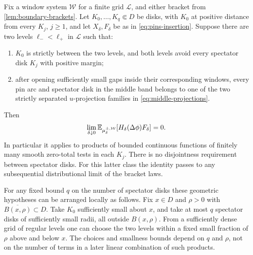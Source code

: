 \begin{proposition}\label{prop:bracket-identity}
Fix a window system $\mathcal W$ for a finite grid
$\mathcal L$, and either bracket from
\cref{lem:boundary-brackets}.  Let $K_0,\ldots,K_q\Subset D$
be disks, with $K_0$ at positive distance from every $K_j$,
$j\ge1$, and let $X_\delta,F_\delta$ be as in
\eqref{eq:pins-insertion}.  Suppose there are two levels
$\ell_-<\ell_+$ in $\mathcal L$ such that:
\begin{enumerate}[label=\textnormal{(\roman*)}]
\item $K_0$ is strictly between the two levels, and both levels
      avoid every spectator disk $K_j$ with positive margin;
\item after opening sufficiently small gaps inside their
      corresponding windows, every pin arc and spectator disk
      in the middle band belongs to one of the two strictly
      separated $u$-projection families in
      \eqref{eq:middle-projections}.
\end{enumerate}
Then
\begin{equation}\label{eq:bracket-identity}
 \lim_{\delta\downarrow0}
   \mathbb E_{\mu^{\pm,\mathcal W}_\delta}
       [H_\delta(\Delta\phi)F_\delta]=0.
\end{equation}
In particular it applies to products of bounded continuous
functions of finitely many smooth zero-total tests in each
$K_j$.  There is no disjointness requirement between spectator
disks.  For this latter class the identity passes to any
subsequential distributional limit of the bracket laws.

For any fixed bound $q$ on the number of spectator disks these
geometric hypotheses can be arranged locally as follows.  Fix
$x\in D$ and $\rho>0$ with $\overline{B(x,\rho)}\subset D$.
Take $K_0$ sufficiently small about $x$, and take at most $q$
spectator disks of sufficiently small radii, all outside
$B(x,\rho)$.  From a sufficiently dense grid of regular levels
one can choose the two levels within a fixed small fraction of
$\rho$ above and below $x$.  The choices and smallness bounds
depend on $q$ and $\rho$, not on the number of terms in a later
linear combination of such products.
\end{proposition}

